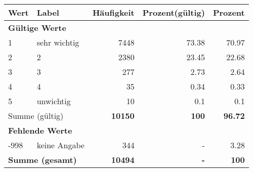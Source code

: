     \begin{longtable}{lXrrr}
     \toprule
     \textbf{Wert} & \textbf{Label} & \textbf{Häufigkeit} & \textbf{Prozent(gültig)} & \textbf{Prozent} \\
     \endhead
     \midrule
     \multicolumn{5}{l}{\textbf{Gültige Werte}}\\

     1 &
     \multicolumn{1}{X}{ sehr wichtig   } &


       \num{7448} &
       \num[round-mode=places,round-precision=2]{73.38} &
         \num[round-mode=places,round-precision=2]{70.97} \\

     2 &
     \multicolumn{1}{X}{ 2   } &


       \num{2380} &
       \num[round-mode=places,round-precision=2]{23.45} &
         \num[round-mode=places,round-precision=2]{22.68} \\

     3 &
     \multicolumn{1}{X}{ 3   } &


       \num{277} &
       \num[round-mode=places,round-precision=2]{2.73} &
         \num[round-mode=places,round-precision=2]{2.64} \\

     4 &
     \multicolumn{1}{X}{ 4   } &


       \num{35} &
       \num[round-mode=places,round-precision=2]{0.34} &
         \num[round-mode=places,round-precision=2]{0.33} \\

     5 &
     \multicolumn{1}{X}{ unwichtig   } &


       \num{10} &
       \num[round-mode=places,round-precision=2]{0.1} &
         \num[round-mode=places,round-precision=2]{0.1} \\
     \midrule
     \multicolumn{2}{l}{Summe (gültig)} &
       \textbf{\num{10150}} &
     \textbf{\num{100}} &
       \textbf{\num[round-mode=places,round-precision=2]{96.72}} \\
     \multicolumn{5}{l}{\textbf{Fehlende Werte}}\\
       -998 &
       keine Angabe &
         \num{344} &
        - &
         \num[round-mode=places,round-precision=2]{3.28} \\
     \midrule
     \multicolumn{2}{l}{\textbf{Summe (gesamt)}} &
          \textbf{\num{10494}} &
        \textbf{-} &
        \textbf{\num{100}} \\
     \bottomrule
     \end{longtable}
     
